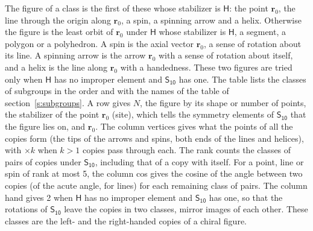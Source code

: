 \documentclass[10pt,a4paper]{article}
\numberwithin{equation}{section}
\newcommand{\grp}[1]{\mathsf{#1}}
\newcommand{\pointr}{\mathbf{r}}
\begin{document}
\leavevmode\label{n:head.figure}The figure of a class is the first of these whose stabilizer is $\grp{H}$: the point $\pointr_0$, the line through the origin along $\pointr_0$, a spin, a spinning arrow and a helix. Otherwise the figure is the least orbit of $\pointr_0$ under $\grp{H}$ whose stabilizer is $\grp{H}$, a segment, a polygon or a polyhedron. A spin is the axial vector $\pointr_0$, a sense of rotation about its line. A spinning arrow is the arrow $\pointr_0$ with a sense of rotation about itself, and a helix is the line along $\pointr_0$ with a handedness. These two figures are tried only when $\grp{H}$ has no improper element and $\grp{S_{10}}$ has one. The table lists the classes of subgroups in the order and with the names of the table of section~\ref{s:subgroups}. \label{n:head.site}A row gives $N$, the figure by its shape or number of points, the stabilizer of the point $\pointr_0$ (site), which tells the symmetry elements of $\grp{S_{10}}$ that the figure lies on, and $\pointr_0$. \label{n:head.vertices}The column vertices gives what the points of all the copies form (the tips of the arrows and spins, both ends of the lines and helices), with ${\times}k$ when $k > 1$ copies pass through each. \label{n:head.rank}The rank counts the classes of pairs of copies under $\grp{S_{10}}$, including that of a copy with itself. \label{n:head.cos}For a point, line or spin of rank at most 5, the column cos gives the cosine of the angle between two copies (of the acute angle, for lines) for each remaining class of pairs. \label{n:head.hand}The column hand gives 2 when $\grp{H}$ has no improper element and $\grp{S_{10}}$ has one, so that the rotations of $\grp{S_{10}}$ leave the copies in two classes, mirror images of each other. These classes are the left- and the right-handed copies of a chiral figure.
\end{document}
